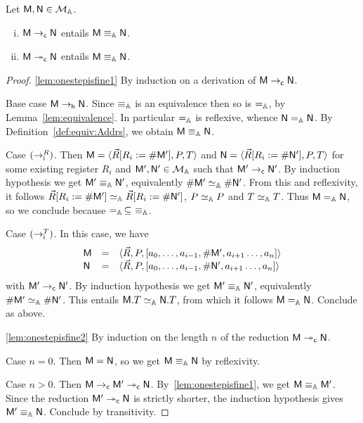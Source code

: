 \begin{lem}\label{lem:onestepisfine}
Let $\mM,\mN\in\cM$.
\begin{enumerate}[(i)]
\item\label{lem:onestepisfine1}
	$\mM\red\mN$ entails $\mM\equiva\mN$.
\item\label{lem:onestepisfine2}
	$\mM\redd\mN$ entails $\mM\equiva\mN$.
\end{enumerate}
\end{lem}

\begin{proof}
\ref{lem:onestepisfine1} By induction on a derivation of $\mM\red\mN$. %

Base case $\mM\redh \mN$. Since $\equiva$ is an equivalence then so is $=_\Addrs$, by Lemma~\ref{lem:equivalence}.
In particular $=_\Addrs$ is reflexive, whence $\mN =_\Addrs \mN$. By Definition~\ref{def:equiv:Addrs}, we obtain $\mM\equiva \mN$.

Case ${(\red[i]^R)}$. Then $\mM = \tuple{\vec R[R_i:= \Lookup \mM'],P,T}$ and $\mN = \tuple{\vec R[R_i:= \Lookup \mN'],P,T}$ for some existing register $R_i$ and $\mM',\mN'\in\cM$ such that $\mM' \red \mN'$. By induction hypothesis we get $\mM' \equiva \mN'$, equivalently $\Lookup\mM' \sima \Lookup\mN'$.
From this and reflexivity, it follows $\vec R[R_i:= \Lookup \mM'] \sima \vec R[R_i:= \Lookup \mN']$, $P \sima P$ and $T \sima T$.
Thus $\mM =_\Addrs \mN$, so we conclude because $=_\Addrs\,\subseteq\  \equiva$.

Case ${(\red[i]^T)}$. In this case, we have
\[
	\begin{array}{lcl}
	\mM &=& \tuple{\vec R,P,[a_0,\dots,a_{i-1},\Lookup \mM',a_{i+1}\dots,a_n]}\\
	 \mN &=& \tuple{\vec R,P,[a_0,\dots,a_{i-1},\Lookup \mN',a_{i+1}\dots,a_n]}
	 \end{array}
\]
with $\mM' \red \mN'$. By induction hypothesis we get $\mM' \equiva \mN'$, equivalently $\Lookup\mM' \sima \Lookup\mN'$.
This entails $\mM.T \sima \mN.T$, from which it follows $\mM =_\Addrs \mN$. Conclude as above.

\ref{lem:onestepisfine2}  By induction on the length $n$ of the reduction $\mM\redd\mN$. %

Case $n=0$. Then $\mM = \mN$, so we get $\mM\equiva\mN$ by reflexivity.

Case $n>0$. Then $\mM\red\mM'\redd\mN$. By~\ref{lem:onestepisfine1}, we get $\mM \equiva \mM'$.
Since the reduction $\mM'\redd\mN$ is strictly shorter, the induction hypothesis gives $\mM' \equiva \mN$.
Conclude by transitivity.
\end{proof}

